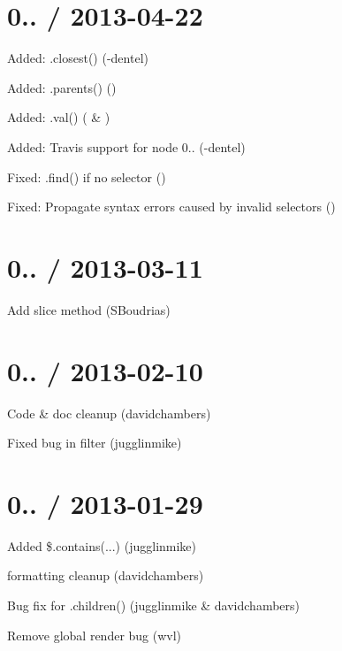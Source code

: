 \section*{0.. / 2013-\/04-\/22 }


\begin{DoxyItemize}
\item Added\+: .closest() (-\/dentel)
\item Added\+: .parents() ()
\item Added\+: .val() ( \& )
\item Added\+: Travis support for node 0.. (-\/dentel)
\item Fixed\+: .find() if no selector ()
\item Fixed\+: Propagate syntax errors caused by invalid selectors ()
\end{DoxyItemize}

\section*{0.. / 2013-\/03-\/11 }


\begin{DoxyItemize}
\item Add slice method (S\+Boudrias)
\end{DoxyItemize}

\section*{0.. / 2013-\/02-\/10 }


\begin{DoxyItemize}
\item Code \& doc cleanup (davidchambers)
\item Fixed bug in filter (jugglinmike)
\end{DoxyItemize}

\section*{0.. / 2013-\/01-\/29 }


\begin{DoxyItemize}
\item Added {\ttfamily \$.contains(...)} (jugglinmike)
\item formatting cleanup (davidchambers)
\item Bug fix for {\ttfamily .children()} (jugglinmike \& davidchambers)
\item Remove global {\ttfamily render} bug (wvl)
\end{DoxyItemize}

